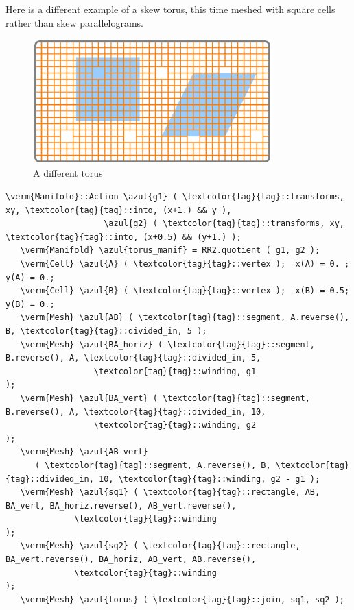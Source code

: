 Here is a different example of a skew torus, this time meshed with square cells
rather than skew parallelograms.

\begin{figure}[ht] \centering
  \includegraphics[width=92mm]{flat-torus-4.eps}
  \caption{A different torus}
  \label{\numb section 7.\numb fig 4}
\end{figure}

\begin{Verbatim}[commandchars=\\\{\},formatcom=\small\tt,frame=single,
   label=parag-\ref{\numb section 7.\numb parag 8}.cpp,rulecolor=\color{coment},
   baselinestretch=0.94,framesep=2mm                                            ]
   \verm{Manifold}::Action \azul{g1} ( \textcolor{tag}{tag}::transforms, xy, \textcolor{tag}{tag}::into, (x+1.) && y ),
                    \azul{g2} ( \textcolor{tag}{tag}::transforms, xy, \textcolor{tag}{tag}::into, (x+0.5) && (y+1.) );
   \verm{Manifold} \azul{torus_manif} = RR2.quotient ( g1, g2 );
   \verm{Cell} \azul{A} ( \textcolor{tag}{tag}::vertex );  x(A) = 0. ;  y(A) = 0.;
   \verm{Cell} \azul{B} ( \textcolor{tag}{tag}::vertex );  x(B) = 0.5;  y(B) = 0.;
   \verm{Mesh} \azul{AB} ( \textcolor{tag}{tag}::segment, A.reverse(), B, \textcolor{tag}{tag}::divided_in, 5 );
   \verm{Mesh} \azul{BA_horiz} ( \textcolor{tag}{tag}::segment, B.reverse(), A, \textcolor{tag}{tag}::divided_in, 5,
                  \textcolor{tag}{tag}::winding, g1                                  );
   \verm{Mesh} \azul{BA_vert} ( \textcolor{tag}{tag}::segment, B.reverse(), A, \textcolor{tag}{tag}::divided_in, 10,
                  \textcolor{tag}{tag}::winding, g2                                  );
   \verm{Mesh} \azul{AB_vert}
      ( \textcolor{tag}{tag}::segment, A.reverse(), B, \textcolor{tag}{tag}::divided_in, 10, \textcolor{tag}{tag}::winding, g2 - g1 );
   \verm{Mesh} \azul{sq1} ( \textcolor{tag}{tag}::rectangle, AB, BA_vert, BA_horiz.reverse(), AB_vert.reverse(),
              \textcolor{tag}{tag}::winding                                                       );
   \verm{Mesh} \azul{sq2} ( \textcolor{tag}{tag}::rectangle, BA_vert.reverse(), BA_horiz, AB_vert, AB.reverse(),
              \textcolor{tag}{tag}::winding                                                       );
   \verm{Mesh} \azul{torus} ( \textcolor{tag}{tag}::join, sq1, sq2 );
\end{Verbatim}

